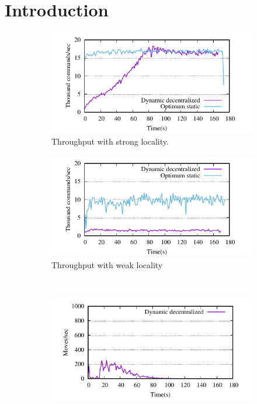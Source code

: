 \section{Introduction}


\begin{figure}[ht!]
  \centering
  \begin{subfigure}[b]{0.45\textwidth}
    \centering
    \includegraphics[width=0.95\columnwidth]{figures/motivation-tp-strong-locality}    
    \caption{Throughput with strong locality.}
  \end{subfigure}
  \begin{subfigure}[b]{0.45\textwidth}
    \centering
    \includegraphics[width=0.95\columnwidth]{figures/motivation-tp-weak-locality}
    \caption{Throughput with weak locality}
  \end{subfigure} \\
  \begin{subfigure}[b]{0.45\textwidth}
    \centering
    \includegraphics[width=0.95\columnwidth]{figures/motivation-moves-strong-locality}

\end{subfigure}
\end{figure}
